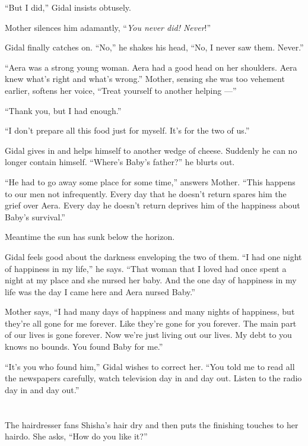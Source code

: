\documentclass[twoside,11pt,openany]{book}
\begin{document}
``But I did,'' Gidal insists obtusely.

Mother silences him adamantly, ``\textit{You never did! Never}!''

Gidal finally catches on. ``No,'' he shakes his head, ``No, I never saw them. Never.''

``Aera was a strong young woman. Aera had a good head on her shoulders. Aera knew what's right and what's
wrong.'' Mother, sensing she was too vehement earlier, softens her voice, ``Treat yourself to
another helping ---''

``Thank you, but I had enough.''

``I don't prepare all this food just for myself. It's for the two of us.''

Gidal gives in and helps himself to another wedge of cheese. Suddenly he can no longer contain
himself.  ``Where's Baby's father?'' he blurts out.

``He had to go away some place for some time,'' answers Mother. ``This happens to
our men not infrequently. Every day that he doesn't return spares him the grief over Aera. Every day he doesn't return
deprives him of the happiness about Baby's survival.''

Meantime the sun has sunk below the horizon.

Gidal feels good about the darkness enveloping the two of them. ``I had one night of happiness in my
life,'' he says. ``That woman that I loved had once spent a night at my place and she nursed
her baby.  And the{ }one day\textit{ }of happiness in my life was the day I
came here and Aera nursed Baby.''

Mother says, ``I had many days of happiness and many nights of happiness, but they're all gone for me
forever. Like they're gone for you forever. The main part of our lives is gone forever. Now we're just living out our
lives. My debt to you knows no bounds. You found Baby for me.''

``It's you who found him,'' Gidal wishes to correct her. ``You told me to read
all the newspapers carefully, watch television day in and day out.
Listen to the radio day in and day out.''



\chapter{}

The hairdresser fans Shisha's hair dry and then puts the finishing touches to her hairdo. She asks, ``How
do you like it?''
\end{document}
